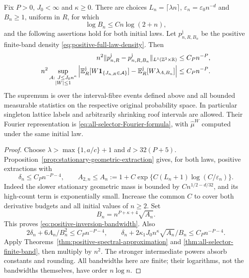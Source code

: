 \begin{theorem}
\label{thm:uniform-positive-microscopic-inversion}
Fix $P>0$, $J_0<\infty$ and $\kappa\ge0$. There are choices
$L_n=\lceil\lambda n\rceil$, $\varepsilon_n=\varepsilon_0n^{-d}$
and $B_n\ge1$, uniform in $R$, for which
\begin{equation}\label{eq:positive-inversion-bandwidth}
 \log B_n\le C n\log(2+n),
\end{equation}
and the following assertions hold for both initial laws. Let
$p_{n,R,B_n}^{\mathrm j}$ be the positive finite-band density
\eqref{eq:positive-full-law-density}. Then
\begin{align}
 n^2\|p_{n,R}^{\mathrm j}-p_{n,R,B_n}^{\mathrm j}\|_{L^1(\Z^3\times\R)}
        &\le C_Pn^{-P},\label{eq:uniform-positive-density}\\
 n^2\sup_{\substack{\mathcal A:\ J\le J_0n^\kappa\\ |W|\le1}}
 \left|\mathbb E_R^{\mathrm j}[W\one_{\{J_{n,R}\in\mathcal A\}}]
       -\mathbb E_R^{\mathrm j}[W\lambda_{A,B_n}]\right|
        &\le C_Pn^{-P}.\label{eq:uniform-positive-all-selectors}
\end{align}
The supremum is over the interval-fibre events defined above and all
bounded measurable statistics on the respective original probability
space. In particular singleton lattice labels and arbitrarily shrinking
roof intervals are allowed. Their Fourier representation is
\eqref{eq:all-selector-Fourier-formula}, with $\widehat\mu^{W}$ computed
under the same initial law.
\end{theorem}
\begin{proof}
Choose $\lambda>\max\{1,a/c\}+1$ and $d>32(P+5)$.
Proposition~\ref{prop:stationary-geometric-extraction} gives, for both
laws, positive extractions with
\[
 \delta_n\le C_Pn^{-P-4},\qquad
 A_{2,n}\le A_n:=1+C\exp\{C(L_n+1)\log(C/\varepsilon_n)\}.
\]
Indeed the slower stationary geometric mass is bounded by
$C n^{1/2-d/32}$, and its high-count term is exponentially small.
Increase the common $C$ to cover both derivative budgets and all
initial values of $n\ge2$. Set
\begin{equation}\label{eq:positive-explicit-bandwidth}
 B_n=n^{P+\kappa+4}\sqrt{A_n}.
\end{equation}
This proves \eqref{eq:positive-inversion-bandwidth}. Also
\[
 2\delta_n+6A_n/B_n^2\le C_Pn^{-P-4},\qquad
 \delta_n+2\kappa_1J_0n^\kappa\sqrt{A_n}/B_n
                                    \le C_Pn^{-P-4}.
\]
Apply Theorems~\ref{thm:positive-spectral-approximation} and
\ref{thm:all-selector-finite-band}, then multiply by $n^2$.
The stronger intermediate powers absorb constants and rounding.
All bandwidths here are finite; their logarithms, not the bandwidths
themselves, have order $n\log n$.
\end{proof}

